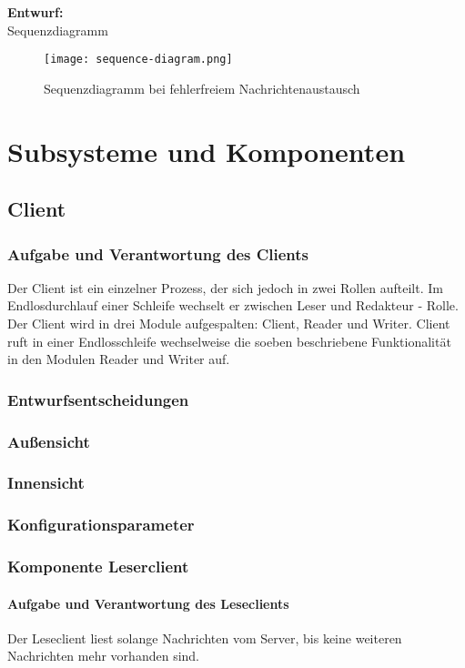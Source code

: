 \documentclass{article}
\begin{document}
	\textbf{Entwurf:}\\
Sequenzdiagramm
\begin{figure}[H]
\centering
	\texttt{[image: sequence-diagram.png]}
\caption[seq-dia]{Sequenzdiagramm bei fehlerfreiem Nachrichtenaustausch}
\label{fig:sequence-diagram}
\end{figure}


\section{Subsysteme und Komponenten}
	\subsection{Client}
		\subsubsection{Aufgabe und Verantwortung des Clients}
			Der Client ist ein einzelner Prozess, der sich jedoch in zwei Rollen aufteilt. 
			Im Endlosdurchlauf einer Schleife wechselt er zwischen 
			Leser und Redakteur - Rolle.
        		\newline
			Der Client wird in drei Module aufgespalten: Client, Reader und Writer. 
			Client ruft in einer Endlosschleife wechselweise die soeben beschriebene 
			Funktionalität in den Modulen Reader und Writer auf.
		\subsubsection{Entwurfsentscheidungen}
		\subsubsection{Außensicht}
		\subsubsection{Innensicht}
		\subsubsection{Konfigurationsparameter}
    	\subsubsection{Komponente Leserclient}
    	
    		\paragraph{Aufgabe und Verantwortung des Leseclients}
    		Der Leseclient liest solange Nachrichten vom Server, 
    		bis keine weiteren Nachrichten mehr vorhanden sind.
\end{document}
